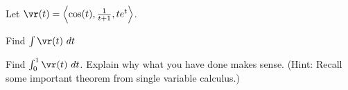 \begin{activity} \label{A:9.7.6} Let $\vr(t) = \left\langle \cos(t), \frac{1}{t+1}, te^t \right\rangle$.
	\ba
	\item Find $\int \vr(t) \ dt$
	
	
	
	\item Find $\int_0^1 \vr(t) \ dt$. Explain why what you have done makes sense. (Hint: Recall some important theorem from single variable calculus.)



	\ea

\end{activity}
\begin{smallhint}

\end{smallhint}
\begin{bighint}

\end{bighint}
\begin{activitySolution}

\end{activitySolution}
\aftera
